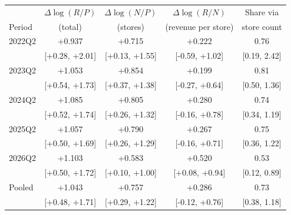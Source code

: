 \begin{tabular}{@{}lcccc@{}}
\toprule
 & $\Delta\log(R/P)$ & $\Delta\log(N/P)$ & $\Delta\log(R/N)$ & Share via \\
Period & (total) & (stores) & (revenue per store) & store count \\
\midrule
2022Q2 & +0.937 & +0.715 & +0.222 & 0.76 \\
 & [+0.28, +2.01] & [+0.13, +1.55] & [-0.59, +1.02] & [0.19, 2.42] \\
2023Q2 & +1.053 & +0.854 & +0.199 & 0.81 \\
 & [+0.54, +1.73] & [+0.37, +1.38] & [-0.27, +0.64] & [0.50, 1.36] \\
2024Q2 & +1.085 & +0.805 & +0.280 & 0.74 \\
 & [+0.52, +1.74] & [+0.26, +1.32] & [-0.16, +0.78] & [0.34, 1.19] \\
2025Q2 & +1.057 & +0.790 & +0.267 & 0.75 \\
 & [+0.50, +1.69] & [+0.26, +1.29] & [-0.16, +0.71] & [0.36, 1.22] \\
2026Q2 & +1.103 & +0.583 & +0.520 & 0.53 \\
 & [+0.50, +1.72] & [+0.10, +1.00] & [+0.08, +0.94] & [0.12, 0.89] \\
\midrule
Pooled & +1.043 & +0.757 & +0.286 & 0.73 \\
 & [+0.48, +1.71] & [+0.29, +1.22] & [-0.12, +0.76] & [0.38, 1.18] \\
\bottomrule
\end{tabular}

